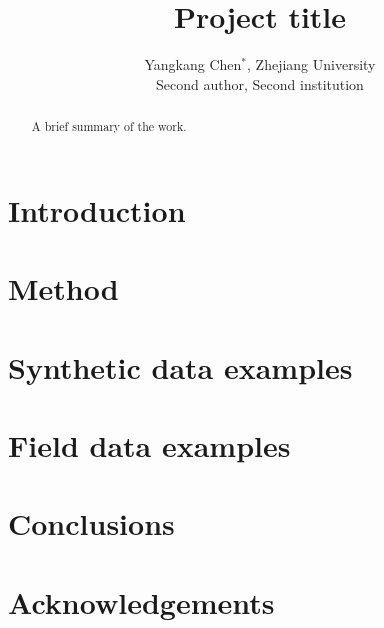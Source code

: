 \documentclass[]{cph18}
\begin{document}
\title{Project title}
\author{Yangkang Chen$^*$, Zhejiang University\\
        Second author, Second institution}
\maketitle

\begin{abstract}
A brief summary of the work.
\end{abstract}

\newpage

\section{Introduction}

\section{Method}

\section{Synthetic data examples}

\section{Field data examples}

 
\section{Conclusions}


\section{Acknowledgements}









\end{document}
